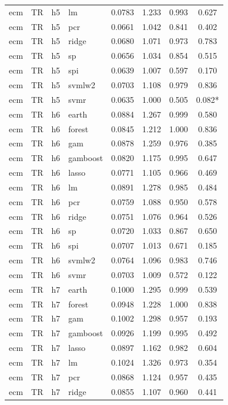 \begin{ThreePartTable}
\begin{longtable}[t]{llclcccc}
ecm & TR & h5 & lm & 0.0783 & 1.233 & 0.993 & 0.627\\
ecm & TR & h5 & pcr & 0.0661 & 1.042 & 0.841 & 0.402\\
ecm & TR & h5 & ridge & 0.0680 & 1.071 & 0.973 & 0.783\\
ecm & TR & h5 & sp & 0.0656 & 1.034 & 0.854 & 0.515\\
ecm & TR & h5 & spi & 0.0639 & 1.007 & 0.597 & 0.170\\
ecm & TR & h5 & svmlw2 & 0.0703 & 1.108 & 0.979 & 0.836\\
ecm & TR & h5 & svmr & 0.0635 & 1.000 & 0.505 & 0.082*\\
\addlinespace
ecm & TR & h6 & earth & 0.0884 & 1.267 & 0.999 & 0.580\\
ecm & TR & h6 & forest & 0.0845 & 1.212 & 1.000 & 0.836\\
ecm & TR & h6 & gam & 0.0878 & 1.259 & 0.976 & 0.385\\
ecm & TR & h6 & gamboost & 0.0820 & 1.175 & 0.995 & 0.647\\
ecm & TR & h6 & lasso & 0.0771 & 1.105 & 0.966 & 0.469\\
ecm & TR & h6 & lm & 0.0891 & 1.278 & 0.985 & 0.484\\
ecm & TR & h6 & pcr & 0.0759 & 1.088 & 0.950 & 0.578\\
ecm & TR & h6 & ridge & 0.0751 & 1.076 & 0.964 & 0.526\\
ecm & TR & h6 & sp & 0.0720 & 1.033 & 0.867 & 0.650\\
ecm & TR & h6 & spi & 0.0707 & 1.013 & 0.671 & 0.185\\
ecm & TR & h6 & svmlw2 & 0.0764 & 1.096 & 0.983 & 0.746\\
ecm & TR & h6 & svmr & 0.0703 & 1.009 & 0.572 & 0.122\\
\addlinespace
ecm & TR & h7 & earth & 0.1000 & 1.295 & 0.999 & 0.539\\
ecm & TR & h7 & forest & 0.0948 & 1.228 & 1.000 & 0.838\\
ecm & TR & h7 & gam & 0.1002 & 1.298 & 0.957 & 0.193\\
ecm & TR & h7 & gamboost & 0.0926 & 1.199 & 0.995 & 0.492\\
ecm & TR & h7 & lasso & 0.0897 & 1.162 & 0.982 & 0.604\\
ecm & TR & h7 & lm & 0.1024 & 1.326 & 0.973 & 0.354\\
ecm & TR & h7 & pcr & 0.0868 & 1.124 & 0.957 & 0.435\\
ecm & TR & h7 & ridge & 0.0855 & 1.107 & 0.960 & 0.441\\

\end{longtable}
\end{ThreePartTable}
